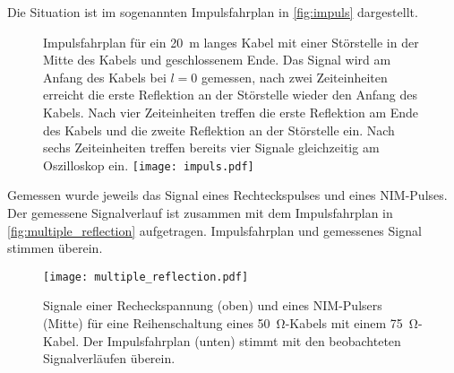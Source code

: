 Die Situation ist im sogenannten Impulsfahrplan in \autoref{fig:impuls} dargestellt.

\begin{figure}
  \captionsetup{format=plain}
  \begin{captionbeside}{%
      Impulsfahrplan für ein \SI{20}{\meter} langes Kabel mit einer Störstelle in
      der Mitte des Kabels und geschlossenem Ende.
      Das Signal wird am  Anfang des Kabels bei $l = 0$ gemessen, nach zwei Zeiteinheiten
      erreicht die erste Reflektion an der Störstelle wieder den Anfang des Kabels.
      Nach vier Zeiteinheiten treffen die erste Reflektion am Ende des Kabels und die
      zweite Reflektion an der Störstelle ein. Nach sechs Zeiteinheiten treffen bereits vier
      Signale gleichzeitig am Oszilloskop ein.
    }%
    \texttt{[image: impuls.pdf]}
  \end{captionbeside}\label{fig:impuls}
\end{figure}

Gemessen wurde jeweils das Signal eines Rechteckspulses und eines NIM-Pulses.
Der gemessene Signalverlauf ist zusammen mit dem Impulsfahrplan in \autoref{fig:multiple_reflection} aufgetragen.
Impulsfahrplan und gemessenes Signal stimmen überein.

\begin{figure}
  \centering
  \texttt{[image: multiple\_reflection.pdf]}
  \caption{%
    Signale einer Recheckspannung (oben) und eines NIM-Pulsers (Mitte) für eine Reihenschaltung eines \SI{50}{\ohm}-Kabels mit einem \SI{75}{\ohm}-Kabel.
    Der Impulsfahrplan (unten) stimmt mit den beobachteten Signalverläufen überein.
  }\label{fig:multiple_reflection}
\end{figure}
